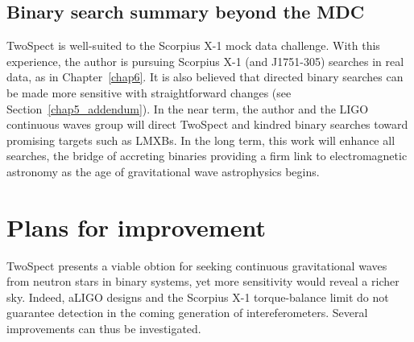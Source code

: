 \subsection{Binary search summary beyond the MDC}
TwoSpect is well-suited to the Scorpius X-1 mock data challenge.
With this experience, the author is pursuing Scorpius X-1 (and J1751-305) searches in real data, as in Chapter~\ref{chap6}.
It is also believed that directed binary searches can be made more sensitive with straightforward changes (see Section~\ref{chap5_addendum}).
In the near term, the author and the LIGO continuous waves group will direct TwoSpect and kindred binary searches toward promising targets such as LMXBs.
In the long term, this work will enhance all searches, the bridge of accreting binaries providing a firm link to electromagnetic astronomy as the age of gravitational wave astrophysics begins.



%
%





\section{Plans for improvement}

TwoSpect presents a viable obtion for seeking continuous gravitational waves from neutron stars in binary systems, yet more sensitivity would reveal a richer sky.
Indeed, aLIGO designs and the Scorpius X-1 torque-balance limit do not guarantee detection in the coming generation of intereferometers.
Several improvements can thus be investigated.

